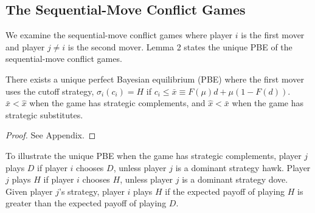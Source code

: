\documentclass[12pt,english]{article}
\begin{document}
\subsection{The Sequential-Move Conflict Games }
We examine the sequential-move conflict games where player $i$ is the first mover and player $j \neq i$ is the second mover. Lemma 2 states the unique PBE of the sequential-move conflict games.
\begin{lem}
There exists a unique perfect Bayesian equilibrium (PBE) where the first mover uses the cutoff strategy, $\sigma_i(c_i)=H$ if $c_i\leq \bar{x} \equiv F(\mu)d+\mu(1-F(d))$. $\bar{x}<\hat{x}$ when the game has strategic complements, and $\hat{x}<\bar{x}$ when the game has strategic substitutes.
\end{lem}
\begin{proof}
See Appendix.
\end{proof} \par 
To illustrate the unique PBE when the game has strategic complements, player $j$ plays $D$ if player $i$ chooses $D$, unless player $j$ is a dominant strategy hawk. Player $j$ plays $H$ if player $i$ chooses $H$, unless player $j$ is a dominant strategy dove. Given player $j$'s strategy, player $i$ plays $H$ if the expected payoff of playing $H$ is greater than the expected payoff of playing $D$.\par
\end{document}
